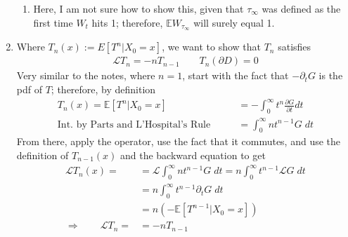 \documentclass[12pt]{article}
\theoremstyle{plain}
\theoremstyle{definition}
\theoremstyle{remark}
\begin{document}
\begin{enumerate}
\begin{enumerate}
      \item %
        Here, I am not sure how to show this, given that $\tau_\infty$
        was defined as the first time $W_t$ hits 1; therefore,
        $\mathbb{E}W_{\tau_\infty}$ will surely equal 1.
    \end{enumerate}

  \item %
    Where $T_n(x):=E[T^n|X_0=x]$, we want to show that $T_n$ satisfies
    \begin{align*}
      \mathscr{L}T_n = -n T_{n-1} \qquad T_n(\partial D)=0
    \end{align*}
    Very similar to the notes, where $n=1$, start with the fact that
    $-\partial_t G$ is the pdf of $T$; therefore, by definition
    \begin{align*}
      T_n(x)=\mathbb{E}[T^n|X_0=x]
      &= -\int^\infty_0 t^n \frac{\partial G}{\partial t} dt\\
      \text{Int.\ by Parts and L'Hospital's Rule} \qquad
      &= \int^\infty_0 n t^{n-1} G \; dt
    \end{align*}
    From there, apply the operator, use the fact that it commutes, and
    use the definition of $T_{n-1}(x)$ and the backward equation to get
    \begin{align*}
      \mathscr{L}T_n(x)=
      &= \mathscr{L}\int^\infty_0 n t^{n-1} G \; dt
      = n\int^\infty_0  t^{n-1} \mathscr{L}G \; dt\\
      &= n\int^\infty_0  t^{n-1} \partial_tG \; dt\\
      &= n(-\mathbb{E}[T^{n-1}|X_0=x])\\
      \Rightarrow\qquad
      \mathscr{L}T_n=
      &= -nT_{n-1}
    \end{align*}


\end{enumerate}
\end{document}
